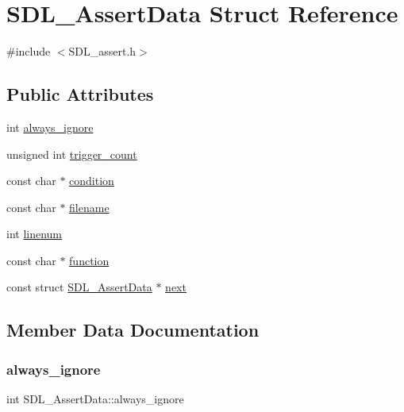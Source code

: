 \hypertarget{struct_s_d_l___assert_data}{}\section{S\+D\+L\+\_\+\+Assert\+Data Struct Reference}
\label{struct_s_d_l___assert_data}


{\ttfamily \#include $<$S\+D\+L\+\_\+assert.\+h$>$}

\subsection*{Public Attributes}
\begin{DoxyCompactItemize}
\item 
int \hyperlink{struct_s_d_l___assert_data_a825e1c7772fe24afad33d0afc42cf04c}{always\+\_\+ignore}
\item 
unsigned int \hyperlink{struct_s_d_l___assert_data_a230bbcc2d115aab04cf817773e08eb5b}{trigger\+\_\+count}
\item 
const char $\ast$ \hyperlink{struct_s_d_l___assert_data_aec6d372462fa8c94a9d04c1168cd38c9}{condition}
\item 
const char $\ast$ \hyperlink{struct_s_d_l___assert_data_acf27f593e6a436386d2cbcf826cf1ef7}{filename}
\item 
int \hyperlink{struct_s_d_l___assert_data_ad026d8573970d2402230d5fa3c550b0f}{linenum}
\item 
const char $\ast$ \hyperlink{struct_s_d_l___assert_data_a4913c57d4affb813feea82fc5f48a25c}{function}
\item 
const struct \hyperlink{struct_s_d_l___assert_data}{S\+D\+L\+\_\+\+Assert\+Data} $\ast$ \hyperlink{struct_s_d_l___assert_data_a2081dcf06dce4df497e423bccddfc099}{next}
\end{DoxyCompactItemize}


\subsection{Member Data Documentation}
\mbox{\label{struct_s_d_l___assert_data_a825e1c7772fe24afad33d0afc42cf04c}} 
\subsubsection{\texorpdfstring{always\+\_\+ignore}{always\_ignore}}
{\footnotesize\ttfamily int S\+D\+L\+\_\+\+Assert\+Data\+::always\+\_\+ignore}


